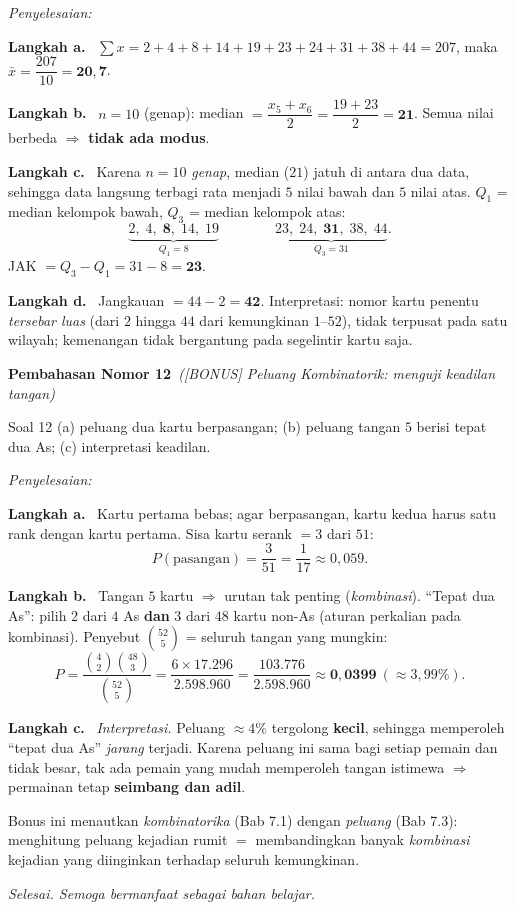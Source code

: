 \documentclass[11pt,a4paper]{article}
\newcommand{\jawab}{\par\smallskip\noindent\textit{\textcolor{oranye}{Penyelesaian:}}\par\smallskip}
\newcommand{\langkah}[1]{\par\smallskip\noindent\textbf{\textcolor{biru}{Langkah #1.}}\ }
\newcommand{\nomorjudul}[2]{\par\bigskip\noindent%
  {\large\bfseries\color{ungu}Pembahasan Nomor #1}\ {\normalfont\itshape\color{gray}(#2)}\par\nopagebreak\smallskip}
\begin{document}
\jawab
\langkah{a} $\sum x=2+4+8+14+19+23+24+31+38+44=207$,
maka $\bar{x}=\dfrac{207}{10}=\mathbf{20{,}7}$.

\langkah{b} $n=10$ (genap): median $=\dfrac{x_5+x_6}{2}=\dfrac{19+23}{2}=\mathbf{21}$.
Semua nilai berbeda $\Rightarrow$ \textbf{tidak ada modus}.

\langkah{c} Karena $n=10$ \emph{genap}, median ($21$) jatuh di antara dua data,
sehingga data langsung terbagi rata menjadi $5$ nilai bawah dan $5$ nilai atas.
$Q_1$ = median kelompok bawah, $Q_3$ = median kelompok atas:
\[
\underbrace{2,\;4,\;\mathbf{8},\;14,\;19}_{Q_1=8}\qquad\qquad
\underbrace{23,\;24,\;\mathbf{31},\;38,\;44}_{Q_3=31}.
\]
JAK $=Q_3-Q_1=31-8=\mathbf{23}$.

\langkah{d} Jangkauan $=44-2=\mathbf{42}$. Interpretasi: nomor kartu penentu
\emph{tersebar luas} (dari $2$ hingga $44$ dari kemungkinan $1$--$52$), tidak
terpusat pada satu wilayah; kemenangan tidak bergantung pada segelintir kartu
saja.

\nomorjudul{12}{[BONUS] Peluang Kombinatorik: menguji keadilan tangan}
\begin{soalbox}{Soal 12}
(a) peluang dua kartu berpasangan; (b) peluang tangan $5$ berisi tepat dua As;
(c) interpretasi keadilan.
\end{soalbox}

\jawab
\langkah{a} Kartu pertama bebas; agar berpasangan, kartu kedua harus satu rank
dengan kartu pertama. Sisa kartu serank $=3$ dari $51$:
\[
P(\text{pasangan})=\dfrac{3}{51}=\dfrac{1}{17}\approx0{,}059.
\]

\langkah{b} Tangan $5$ kartu $\Rightarrow$ urutan tak penting (\emph{kombinasi}).
``Tepat dua As'': pilih $2$ dari $4$ As \textbf{dan} $3$ dari $48$ kartu non-As
(aturan perkalian pada kombinasi). Penyebut $\binom{52}{5}$ = seluruh tangan yang
mungkin:
\[
P=\dfrac{\binom{4}{2}\binom{48}{3}}{\binom{52}{5}}
=\dfrac{6\times17.296}{2.598.960}
=\dfrac{103.776}{2.598.960}\approx\mathbf{0{,}0399}\ (\approx3{,}99\%).
\]

\langkah{c} \emph{Interpretasi.} Peluang $\approx4\%$ tergolong \textbf{kecil},
sehingga memperoleh ``tepat dua As'' \emph{jarang} terjadi. Karena peluang ini
sama bagi setiap pemain dan tidak besar, tak ada pemain yang mudah memperoleh
tangan istimewa $\Rightarrow$ permainan tetap \textbf{seimbang dan adil}.

\begin{tips}
Bonus ini menautkan \emph{kombinatorika} (Bab 7.1) dengan \emph{peluang}
(Bab 7.3): menghitung peluang kejadian rumit $=$ membandingkan banyak
\emph{kombinasi} kejadian yang diinginkan terhadap seluruh kemungkinan.
\end{tips}

\vfill
\begin{center}\small\itshape
Selesai. Semoga bermanfaat sebagai bahan belajar.
\end{center}
\end{document}

